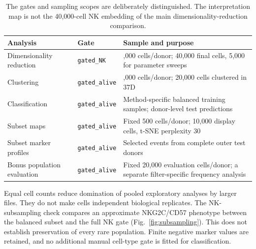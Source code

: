\documentclass[11pt,a4paper]{article}
\begin{document}
\begin{table}[htb]\centering\small
\begin{tabular}{@{}>{\raggedright\arraybackslash}p{.25\linewidth}>{\raggedright\arraybackslash}p{.18\linewidth}>{\raggedright\arraybackslash}p{.49\linewidth}@{}}\toprule
Analysis & Gate & Sample and purpose\\\midrule
Dimensionality reduction & \texttt{gated\_NK} & 2,000 cells/donor; 40,000 final cells, 5,000 for parameter sweeps\\
Clustering & \texttt{gated\_alive} & 1,000 cells/donor; 20,000 cells clustered in 37D\\
Classification & \texttt{gated\_alive} & Method-specific balanced training samples; donor-level test predictions\\
Subset maps & \texttt{gated\_alive} & Fixed 500 cells/donor; 10,000 display cells, t-SNE perplexity 30\\
Subset marker profiles & \texttt{gated\_alive} & Selected events from complete outer test donors\\
Bonus population evaluation & \texttt{gated\_alive} & Fixed 20,000 evaluation cells/donor; a separate filter-specific frequency analysis\\\bottomrule
\end{tabular}
\caption{The gates and sampling scopes are deliberately distinguished. The interpretation map is not the 40,000-cell NK embedding of the main dimensionality-reduction comparison.}
\end{table}

Equal cell counts reduce domination of pooled exploratory analyses by larger files. They do not make cells independent biological replicates. The NK-subsampling check compares an approximate NKG2C/CD57 phenotype between the balanced subset and the full NK gate (Fig.~\ref{fig:subsampling}). This does not establish preservation of every rare population. Finite negative marker values are retained, and no additional manual cell-type gate is fitted for classification.

\clearpage
\begin{table}[htb]\centering\small

\caption{Donor inventory from the current raw-data summaries. Test visits are the appearances in the 30 common outer splits. The same counts apply to every method. NK/alive is a percentage, not an additional classifier feature.}
\label{tab:donors}
\end{table}
\end{document}
